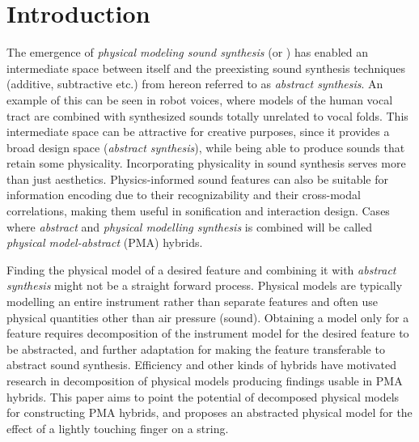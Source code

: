 \documentclass{sigchi}
\def\plainkeywords{physical modelling; audio features}
\begin{document}

\keywords{\plainkeywords}

\printccsdesc

\section{Introduction}
The emergence of \textit{physical modeling sound synthesis} (or ) has enabled an intermediate space between itself and the preexisting sound synthesis techniques (additive, subtractive etc.) from hereon referred to as \textit{abstract synthesis}.
An example of this can be seen in robot voices, where models of the human vocal tract are combined with synthesized sounds totally unrelated to vocal folds.
This intermediate space can be attractive for creative purposes, since it provides a broad design space (\textit{abstract synthesis}), while being able to produce sounds that retain some physicality.
Incorporating physicality in sound synthesis serves more than just aesthetics.
Physics-informed sound features can also be suitable for information encoding due to their recognizability and their cross-modal correlations, making them useful in sonification and interaction design.
Cases where \textit{abstract} and \textit{physical modelling synthesis} is combined will be called \textit{physical model-abstract} (PMA) hybrids.

Finding the physical model of a desired feature and combining it with \textit{abstract synthesis} might not be a straight forward process.
Physical models are typically modelling an entire instrument rather than separate features and often use physical quantities other than air pressure (sound).
Obtaining a model only for a feature requires decomposition of the instrument model for the desired feature to be abstracted, and further adaptation for making the feature transferable to abstract sound synthesis.
Efficiency and other kinds of hybrids have motivated research in decomposition of physical models \cite{erkut_modular_2005,karjalainen_plucked-string_1998} producing findings usable in PMA hybrids.
This paper aims to point the potential of decomposed physical models for constructing PMA hybrids, and proposes an abstracted physical model for the effect of a lightly touching finger on a string.
\end{document}
